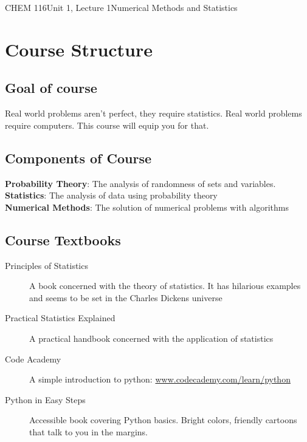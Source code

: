 \documentclass{article}
\begin{document}
\begin{tdoc}{CHEM 116}{Unit 1, Lecture 1}{Numerical Methods and Statistics} 

\section{Course Structure}

\subsection{Goal of course}

Real world problems aren't perfect, they require statistics. Real
world problems require computers. This course will equip you for that.

\subsection{Components of Course}

{\bf Probability Theory}: The analysis of randomness of sets and variables.\vspace{0.2cm}\\
{\bf Statistics}: The analysis of data using probability theory\vspace{0.2cm}\\
{\bf Numerical Methods}: The solution of numerical problems with algorithms\vspace{0.2cm}\\

\subsection{Course Textbooks}

\begin{description}

\item[Principles of Statistics]{A book concerned with the theory of statistics. It has hilarious examples and seems to be set in the Charles Dickens universe}

\item[Practical Statistics Explained]{A practical handbook concerned with the application of statistics}

\item[Code Academy]{A simple introduction to python: \href{https://www.codecademy.com/learn/python}{www.codecademy.com/learn/python}}

\item[Python in Easy Steps]{Accessible book covering Python basics. Bright colors, friendly cartoons that talk to you in the margins.}


\end{description}
\end{tdoc}
\end{document}
